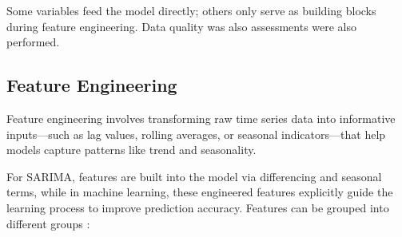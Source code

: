 Some variables feed the model directly; others only serve as building 
blocks during feature engineering. Data quality was also assessments were
also performed.


\subsection{Feature Engineering}
\label{subsec:feature-eng}
Feature engineering involves transforming raw time series data into informative 
inputs—such as lag values, rolling averages, or seasonal indicators—that help 
models capture patterns like trend and seasonality.

For SARIMA, features are built into the model via differencing and seasonal terms, 
while in machine learning, these engineered features explicitly guide the learning
process to improve prediction accuracy. Features can be grouped into different groups : 

